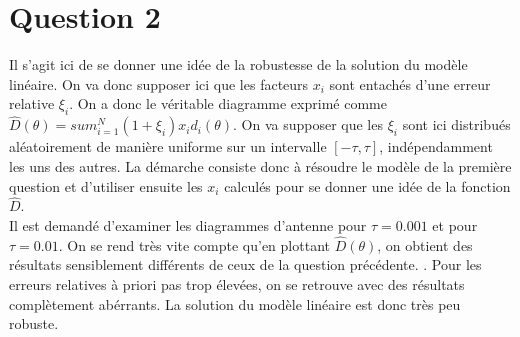 \section*{Question 2}
Il s'agit ici de se donner une idée de la robustesse de la solution du modèle linéaire. On va donc supposer ici que les facteurs $x_i$ sont entachés d'une erreur relative $\xi_i$. On a donc le véritable diagramme exprimé comme $\hat{D}(\theta) = sum_{i=1}^{N}{(1+\xi_i)x_i d_i(\theta)}$. On va supposer que les $\xi_i$ sont ici distribués aléatoirement de manière uniforme sur un intervalle $[-\tau,\tau]$, indépendamment les uns des autres. La démarche consiste donc à résoudre le modèle de la première question et d'utiliser ensuite les $x_i$ calculés pour se donner une idée de la fonction $\hat{D}$.\\
Il est demandé d'examiner les diagrammes d'antenne pour $\tau = 0.001$ et pour $\tau = 0.01$. On se rend très vite compte qu'en plottant $\hat{D}(\theta)$, on obtient des résultats sensiblement différents de ceux de la question précédente. . Pour les erreurs relatives à priori pas trop élevées, on se retrouve avec des résultats complètement abérrants. La solution du modèle linéaire est donc très peu robuste.
